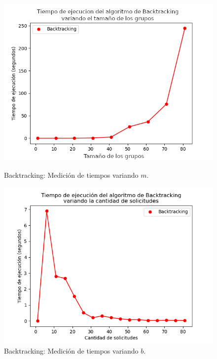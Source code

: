 \begin{figure}[h]
    \centering
    \begin{minipage}{0.45\textwidth}
        \centering
        \includegraphics[width=\textwidth]{img/medicion_t_backtracking_var_m.png}
        \caption{Backtracking: Medición de tiempos variando $m$.}
        \label{fig:medicion_t_backtracking_var_m}
    \end{minipage}\hfill
    \begin{minipage}{0.45\textwidth}
        \centering
        \includegraphics[width=\textwidth]{img/medicion_t_backtracking_var_b.png}
        \caption{Backtracking: Medición de tiempos variando $b$.}
        \label{fig:medicion_t_backtracking_var_b}
    \end{minipage}
\end{figure}

